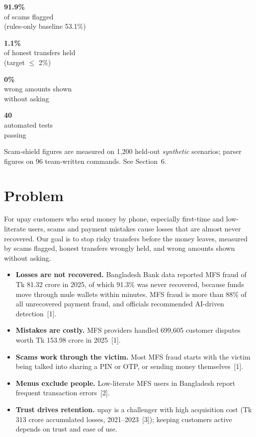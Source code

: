 \documentclass[11pt,a4paper]{article}
\newcommand{\metric}[2]{%
  \begin{minipage}[t]{0.235\textwidth}\centering
  {\sffamily\bfseries\fontsize{19}{22}\selectfont\color{navy}#1}\\[2pt]
  {\sffamily\scriptsize\color{muted}#2}\end{minipage}}
\begin{document}
\vspace{12pt}
\noindent\metric{91.9\%}{of scams flagged\\(rules-only baseline 53.1\%)}\hfill
\metric{1.1\%}{of honest transfers held\\(target $\le$ 2\%)}\hfill
\metric{0\%}{wrong amounts shown\\without asking}\hfill
\metric{40}{automated tests\\passing}
\par\vspace{4pt}
{\sffamily\scriptsize\color{muted} Scam-shield figures are measured on 1,200 held-out \emph{synthetic} scenarios; parser figures on 96 team-written commands. See Section~6.}


\section{Problem}

For upay customers who send money by phone, especially first-time and low-literate users, scams and payment mistakes cause losses that are almost never recovered. Our goal is to stop risky transfers before the money leaves, measured by scams flagged, honest transfers wrongly held, and wrong amounts shown without asking.

\begin{itemize}
  \item \textbf{Losses are not recovered.} Bangladesh Bank data reported MFS fraud of Tk 81.32 crore in 2025, of which 91.3\% was never recovered, because funds move through mule wallets within minutes. MFS fraud is more than 88\% of all unrecovered payment fraud, and officials recommended AI-driven detection~[1].
  \item \textbf{Mistakes are costly.} MFS providers handled 699,605 customer disputes worth Tk 153.98 crore in 2025~[1].
  \item \textbf{Scams work through the victim.} Most MFS fraud starts with the victim being talked into sharing a PIN or OTP, or sending money themselves~[1].
  \item \textbf{Menus exclude people.} Low-literate MFS users in Bangladesh report frequent transaction errors~[2].
  \item \textbf{Trust drives retention.} upay is a challenger with high acquisition cost (Tk 313 crore accumulated losses, 2021–2023~[3]); keeping customers active depends on trust and ease of use.
\end{itemize}
\end{document}
